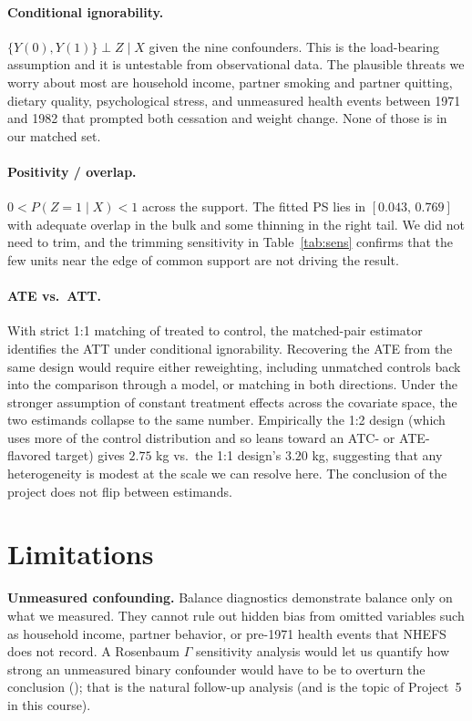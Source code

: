 \documentclass[11pt]{article}
\begin{document}
\paragraph{Conditional ignorability.}
$\{Y(0), Y(1)\} \perp Z \mid X$ given the nine confounders. This is the
load-bearing assumption and it is untestable from observational data.
The plausible threats we worry about most are household income, partner
smoking and partner quitting, dietary quality, psychological stress, and
unmeasured health events between 1971 and 1982 that prompted both
cessation and weight change. None of those is in our matched set.

\paragraph{Positivity / overlap.}
$0 < P(Z = 1 \mid X) < 1$ across the support. The fitted PS lies in
$[0.043,\,0.769]$ with adequate overlap in the bulk and some thinning in
the right tail. We did not need to trim, and the trimming sensitivity in
Table~\ref{tab:sens} confirms that the few units near the edge of common
support are not driving the result.

\paragraph{ATE vs.\ ATT.}
With strict 1:1 matching of treated to control, the matched-pair estimator
identifies the ATT under conditional ignorability. Recovering the ATE
from the same design would require either reweighting, including
unmatched controls back into the comparison through a model, or matching
in both directions. Under the stronger assumption of constant treatment
effects across the covariate space, the two estimands collapse to the
same number. Empirically the 1:2 design (which uses more of the control
distribution and so leans toward an ATC- or ATE-flavored target) gives
$2.75$ kg vs.\ the 1:1 design's $3.20$ kg, suggesting that any
heterogeneity is modest at the scale we can resolve here. The conclusion
of the project does not flip between estimands.

\section{Limitations}

\textbf{Unmeasured confounding.}
Balance diagnostics demonstrate balance only on what we measured. They
cannot rule out hidden bias from omitted variables such as household
income, partner behavior, or pre-1971 health events that NHEFS does not
record. A Rosenbaum $\Gamma$ sensitivity analysis would let us quantify
how strong an unmeasured binary confounder would have to be to overturn
the conclusion (\cite{rosenbaum2002}); that is the natural follow-up
analysis (and is the topic of Project~5 in this course).
\end{document}
